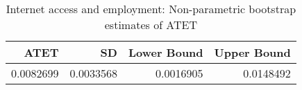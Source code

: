 \begin{table}[!h]
\centering
\caption{\label{tab:tab:np_atet}Internet access and employment: Non-parametric bootstrap estimates of ATET}
\centering
\begin{tabular}[t]{rrrr}
\toprule
ATET & SD & Lower Bound & Upper Bound\\
\midrule
0.0082699 & 0.0033568 & 0.0016905 & 0.0148492\\
\bottomrule
\end{tabular}
\end{table}
